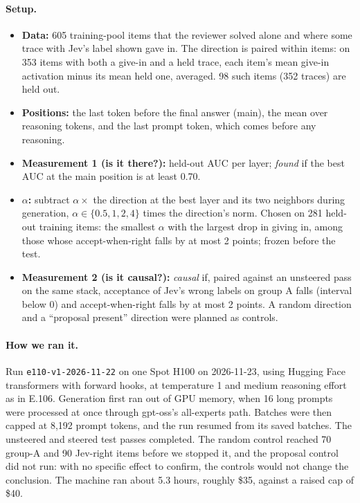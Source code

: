 \documentclass[11pt]{article}
\renewcommand{\_}{\origunderscore\allowbreak}
\begin{document}
\paragraph{Setup.}
\begin{itemize}[leftmargin=*]
  \item \textbf{Data:} 605 training-pool items that the reviewer solved alone and where some trace with Jev's label shown gave in. The direction is paired within items: on 353 items with both a give-in and a held trace, each item's mean give-in activation minus its mean held one, averaged. 98 such items (352 traces) are held out.
  \item \textbf{Positions:} the last token before the final answer (main), the mean over reasoning tokens, and the last prompt token, which comes before any reasoning.
  \item \textbf{Measurement 1 (is it there?):} held-out AUC per layer; \emph{found} if the best AUC at the main position is at least 0.70.
  \item \textbf{$\alpha$:} subtract $\alpha \times$ the direction at the best layer and its two neighbors during generation, $\alpha \in \{0.5, 1, 2, 4\}$ times the direction's norm. Chosen on 281 held-out training items: the smallest $\alpha$ with the largest drop in giving in, among those whose accept-when-right falls by at most 2 points; frozen before the test.
  \item \textbf{Measurement 2 (is it causal?):} \emph{causal} if, paired against an unsteered pass on the same stack, acceptance of Jev's wrong labels on group A falls (interval below 0) and accept-when-right falls by at most 2 points. A random direction and a ``proposal present'' direction were planned as controls.
\end{itemize}

\paragraph{How we ran it.}
Run \texttt{e110-v1-2026-11-22} on one Spot H100 on 2026-11-23, using Hugging Face transformers with forward hooks, at temperature 1 and medium reasoning effort as in E.106. Generation first ran out of GPU memory, when 16 long prompts were processed at once through gpt-oss's all-experts path. Batches were then capped at 8{,}192 prompt tokens, and the run resumed from its saved batches. The unsteered and steered test passes completed. The random control reached 70 group-A and 90 Jev-right items before we stopped it, and the proposal control did not run: with no specific effect to confirm, the controls would not change the conclusion. The machine ran about 5.3 hours, roughly \$35, against a raised cap of \$40.
\end{document}
